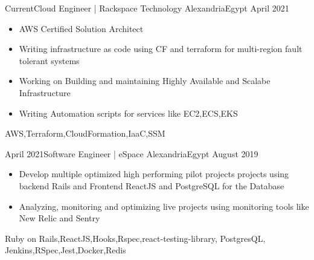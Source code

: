 \begin{experiences}
  \experience
    {Current}{Cloud Engineer | Rackspace Technology }{Alexandria}{Egypt}
    {April 2021}   {
                      \begin{itemize}
                        \item AWS Certified Solution Architect 
                        \item Writing infrastructure as code using CF and terraform for multi-region fault tolerant systems
                        \item  Working on Building and maintaining Highly Available and Scalabe Infrastructure 
                        \item Writing Automation scripts for services like EC2,ECS,EKS
                      \end{itemize}
                    }
                {AWS,Terraform,CloudFormation,IaaC,SSM} 
 \emptySeparator

  \experience
    {April 2021}{Software Engineer | eSpace }{Alexandria}{Egypt}
    {August 2019}   {
                      \begin{itemize}
                        \item  Develop multiple optimized high performing  pilot projects projects using backend Rails and Frontend ReactJS and PostgreSQL for the Database
                        \item Analyzing, monitoring and optimizing live projects using monitoring tools like New Relic and Sentry
                      \end{itemize}
                    }
                    {Ruby on Rails,ReactJS,Hooks,Rspec,react-testing-library, PostgresQL, Jenkins,RSpec,Jest,Docker,Redis}                    
\end{experiences}
